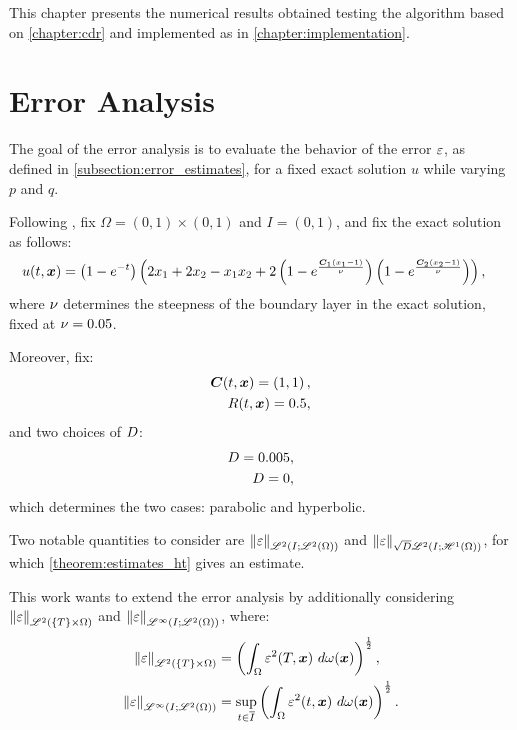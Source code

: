 This chapter presents the numerical results obtained testing the algorithm based on \cref{chapter:cdr} and implemented as in \cref{chapter:implementation}.

\section{Error Analysis}

The goal of the error analysis is to evaluate the behavior of the error $\varepsilon$, as defined in \cref{subsection:error_estimates}, for a fixed exact solution $u$ while varying $p$ and $q$.

Following \cite{Feistauer2007}, fix $\Omega = \left( 0, 1 \right) \times \left( 0, 1 \right)$ and $I = \left( 0, 1 \right)$, and fix the exact solution as follows:
\begin{align}
    u(t, \bm{x}) &= \left( 1 - e^{-t} \right) \left( 2 x_1 + 2 x_2 - x_1 x_2 + 2 \left( 1 - e^{\frac{\bm{C}_1 \left( x_1 - 1 \right) }{\nu}} \right) \left( 1 - e^{\frac{\bm{C}_2 \left( x_2 - 1 \right) }{\nu}} \right) \right),
\end{align}
where $\nu$ determines the steepness of the boundary layer in the exact solution, fixed at $\nu = 0.05$.

Moreover, fix:
\begin{align}
    \bm{C}(t, \bm{x}) = \left( 1, 1 \right), \\
    R(t, \bm{x}) = 0.5,
\end{align}
and two choices of $D$:
\begin{align}
    D = 0.005, \\
    D = 0,
\end{align}
which determines the two cases: parabolic and hyperbolic.

Two notable quantities to consider are $\left\lVert \varepsilon \right\rVert_{\mathscr{L}^{2}(I; \mathscr{L}^{2}(\Omega))}$ and $\left\lVert \varepsilon \right\rVert_{\sqrt{D} \mathscr{L}^{2}(I; \mathscr{H}^{1}(\Omega))}$, for which \cref{theorem:estimates_ht} gives an estimate. 

This work wants to extend the error analysis by additionally considering $\left\lVert \varepsilon \right\rVert_{\mathscr{L}^{2}(\left\{ T \right\} \times \Omega)}$ and $\left\lVert \varepsilon \right\rVert_{\mathscr{L}^{\infty}(I; \mathscr{L}^{2}(\Omega))}$, where:
\begin{align}
    \left\lVert \varepsilon \right\rVert_{\mathscr{L}^{2}(\left\{ T \right\} \times \Omega)} &= \left( \int_{\Omega} \varepsilon^2(T, \bm{x}) ~ d \omega (\bm{x}) \right)^{\frac12}, \\
    \left\lVert \varepsilon \right\rVert_{\mathscr{L}^{\infty}(I; \mathscr{L}^{2}(\Omega))} &= \sup_{t \in \overline{I}} \left( \int_{\Omega} \varepsilon^2(t, \bm{x}) ~ d \omega (\bm{x}) \right)^{\frac12}.
\end{align}

